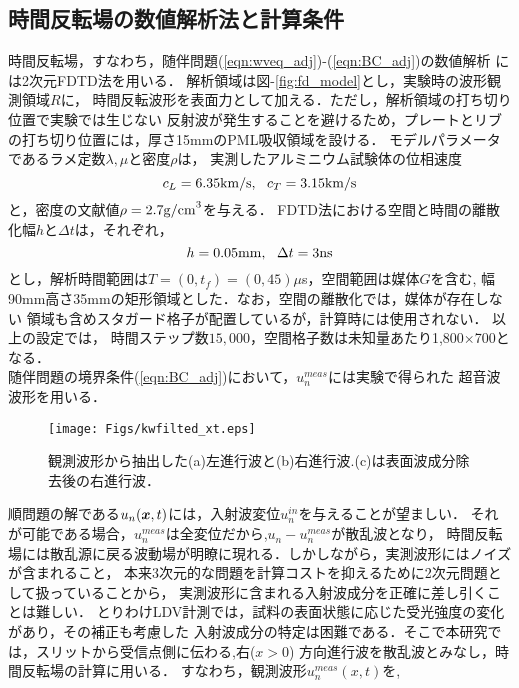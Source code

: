\subsection{時間反転場の数値解析法と計算条件}
時間反転場，すなわち，随伴問題(\ref{eqn:wveq_adj})-(\ref{eqn:BC_adj})の数値解析
には2次元FDTD法\cite{Fellinger1995, FDTD_KK}を用いる．
解析領域は図-\ref{fig:fd_model}とし，実験時の波形観測領域$R$に，
時間反転波形を表面力として加える．ただし，解析領域の打ち切り位置で実験では生じない
反射波が発生することを避けるため，プレートとリブの打ち切り位置には，厚さ15mmのPML吸収領域を設ける．
モデルパラメータであるラメ定数$\lambda,\mu$と密度$\rho$は，
実測したアルミニウム試験体の位相速度
\begin{equation}
	c_L=6.35{\rm km/s}, \ \ c_T=3.15{\rm km/s}
	\label{eqn:phase_vels}
\end{equation}
と，密度の文献値$\rho=2.7{\rm g/cm}^3$を与える．
FDTD法における空間と時間の離散化幅$h$と$\Delta t$は，それぞれ，
\begin{equation}
	h=0.05{\rm mm}, \ \ \Delta t=3{\rm ns}
	\label{eqn:}
\end{equation}
とし，解析時間範囲は$T=(0,t_f)=(0,45)\mu$s，空間範囲は媒体$G$を含む,
幅90mm高さ35mmの矩形領域とした．なお，空間の離散化では，媒体が存在しない
領域も含めスタガード格子が配置しているが，計算時には使用されない．
以上の設定では，
時間ステップ数$15,000$，空間格子数は未知量あたり1,800$\times$700となる．\\
\hspace{\parindent}
随伴問題の境界条件(\ref{eqn:BC_adj})において，$u_n^{meas}$には実験で得られた
超音波波形を用いる．
\begin{figure}[thb]
\centering
	\texttt{[image: Figs/kwfilted\_xt.eps]}
	\caption{観測波形から抽出した(a)左進行波と(b)右進行波.(c)は表面波成分除去後の右進行波．}
	\label{fig:kwfilted_xt}
\end{figure}
順問題の解である$u_n(\boldsymbol{x},t)$には，入射波変位$u_n^{in}$を与えることが望ましい．
それが可能である場合，$u_n^{meas}$は全変位だから,$u_n-u_n^{meas}$が散乱波となり，
時間反転場には散乱源に戻る波動場が明瞭に現れる．しかしながら，実測波形にはノイズが含まれること，
本来3次元的な問題を計算コストを抑えるために2次元問題として扱っていることから，
実測波形に含まれる入射波成分を正確に差し引くことは難しい．
とりわけLDV計測では，試料の表面状態に応じた受光強度の変化があり，その補正も考慮した
入射波成分の特定は困難である．そこで本研究では，スリットから受信点側に伝わる,右($x>0$)
方向進行波を散乱波とみなし，時間反転場の計算に用いる．
すなわち，観測波形$u_n^{meas}(x,t)$を,
